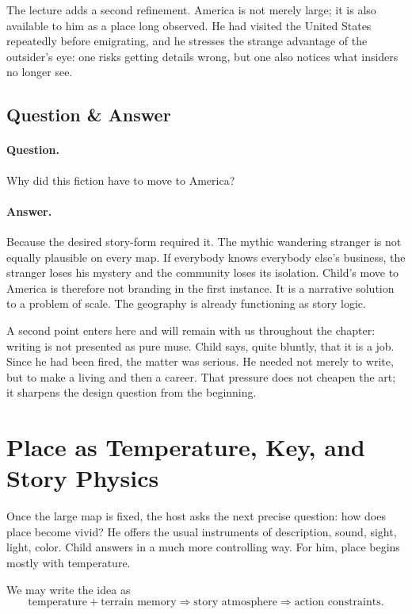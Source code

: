 The lecture adds a second refinement. America is not merely large; it is also available to him as a place long observed. He had visited the United States repeatedly before emigrating, and he stresses the strange advantage of the outsider's eye: one risks getting details wrong, but one also notices what insiders no longer see.

\subsection{Question \& Answer}

\paragraph{Question.} Why did this fiction have to move to America?

\paragraph{Answer.} Because the desired story-form required it. The mythic wandering stranger is not equally plausible on every map. If everybody knows everybody else's business, the stranger loses his mystery and the community loses its isolation. Child's move to America is therefore not branding in the first instance. It is a narrative solution to a problem of scale. The geography is already functioning as story logic.

A second point enters here and will remain with us throughout the chapter: writing is not presented as pure muse. Child says, quite bluntly, that it is a job. Since he had been fired, the matter was serious. He needed not merely to write, but to make a living and then a career. That pressure does not cheapen the art; it sharpens the design question from the beginning.

\section{Place as Temperature, Key, and Story Physics}

Once the large map is fixed, the host asks the next precise question: how does place become vivid? He offers the usual instruments of description, sound, sight, light, color. Child answers in a much more controlling way. For him, place begins mostly with temperature.

We may write the idea as
\begin{equation}
\text{temperature} + \text{terrain memory} \Longrightarrow \text{story atmosphere} \Longrightarrow \text{action constraints}.
\end{equation}

